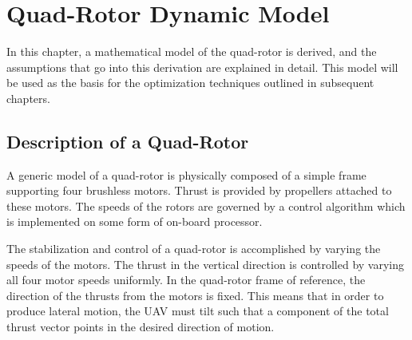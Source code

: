 
\chapter{Quad-Rotor Dynamic Model} %

\label{Chapter3} %



In this chapter, a mathematical model of the quad-rotor is derived, and the assumptions that go into this derivation are explained in detail. This model will be used as the basis for the optimization techniques outlined in subsequent chapters.

\section{Description of a Quad-Rotor}

A generic model of a quad-rotor is physically composed of a simple frame supporting four brushless motors. Thrust is provided by propellers attached to these motors. The speeds of the rotors are governed by a control algorithm which is implemented on some form of on-board processor.

 The stabilization and control of a quad-rotor is accomplished by varying the speeds of the motors. The thrust in the vertical direction is controlled by varying all four motor speeds uniformly. In the quad-rotor frame of reference, the direction of the thrusts from the motors is fixed. This means that in order to produce lateral motion, the UAV must tilt such that a component of the total thrust vector points in the desired direction of motion.

